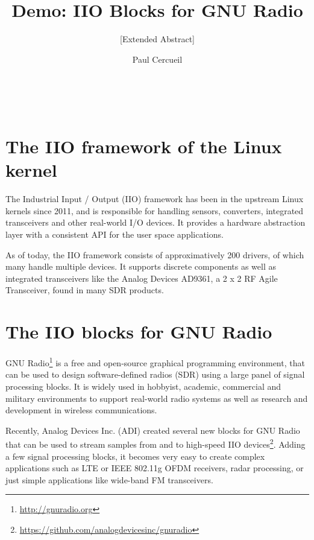 \documentclass{sig-alternate-2013}
\begin{document}
\title{Demo: IIO Blocks for GNU Radio}
\subtitle{[Extended Abstract]}


\author{
\alignauthor
Paul Cercueil\\
	\\
	\\
	\\
}

\maketitle


\section{The IIO framework of the Linux kernel}

The Industrial Input / Output (IIO) framework has been in
the upstream Linux kernels since 2011, and is responsible for handling sensors,
converters, integrated transceivers and other real-world I/O devices. It provides
a hardware abstraction layer with a consistent API for the user space
applications.

As of today, the IIO framework consists of approximatively 200 drivers,
of which many handle multiple devices.
It supports discrete components as well as
integrated transceivers like the Analog Devices AD9361, a 2 x 2 RF Agile Transceiver, found in many SDR products.

\section{The IIO blocks for GNU Radio}

GNU Radio\footnote{\url{http://gnuradio.org}}
is a free and open-source graphical programming environment, that can
be used to design software-defined radios (SDR) using a large panel of signal
processing blocks. It is widely used in hobbyist, academic, commercial and
military environments to support real-world radio systems as well as research
and development in wireless communications.

Recently, Analog Devices Inc. (ADI) created several new blocks for GNU Radio
that can be used to stream samples from and to high-speed IIO
devices\footnote{\url{https://github.com/analogdevicesinc/gnuradio}}.
Adding a few signal processing
blocks, it becomes very easy to create complex applications such as
LTE or IEEE 802.11g OFDM receivers, radar processing, or just simple
applications like wide-band FM transceivers.
\end{document}
